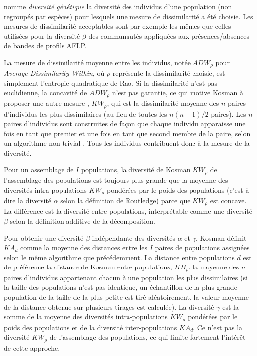 \documentclass[
  11pt,
  french,
  a4paper,
  extrafontsizes,onecolumn,openright
  ]{memoir}
\begin{document}
\textcite{Kosman2013} nomme \emph{diversité génétique} la diversité des individus d'une population (non regroupés par espèces) pour lesquels une mesure de dissimilarité a été choisie.
Les mesures de dissimilarité acceptables \autocite{Kosman2005} sont par exemple les mêmes que celles utilisées pour la diversité \(\beta\) des communautés appliquées aux présences/absences de bandes de profils AFLP.

La mesure de dissimilarité moyenne entre les individus, notée \(ADW_{\rho}\) pour \emph{Average Dissimilarity Within}, où \(\rho\) représente la dissimilarité choisie, est simplement l'entropie quadratique de Rao.
Si la dissimilarité n'est pas euclidienne, la concavité de \(ADW_{\rho}\) n'est pas garantie, ce qui motive Kosman à proposer une autre mesure \autocite{Kosman1996,Kosman2007}, \({KW}_{\rho}\), qui est la dissimilarité moyenne des \(n\) paires d'individus les plus dissimilaires (au lieu de toutes les \({n(n-1)}/{2}\) paires).
Les \(n\) paires d'individus sont construites de façon que chaque individu apparaisse une fois en tant que premier et une fois en tant que second membre de la paire, selon un algorithme non trivial \autocite{Bellman1970}.
Tous les individus contribuent donc à la mesure de la diversité.

Pour un assemblage de \(I\) populations, la diversité de Kosman \({KW}_{\rho}\) de l'assemblage des populations est toujours plus grande que la moyenne des diversités intra-populations \({KW}_{\rho}\) pondérées par le poids des populations (c'est-à-dire la diversité \(\alpha\) selon la définition de Routledge) parce que \({KW}_{\rho}\) est concave.
La différence est la diversité entre populations, interprétable comme une diversité \(\beta\) selon la définition additive de la décomposition.

Pour obtenir une diversité \(\beta\) indépendante des diversités \(\alpha\) et \(\gamma\), Kosman définit \({KA}_{d}\) comme la moyenne des distances entre les \(I\) paires de populations assignées selon le même algorithme que précédemment.
La distance entre populations \(d\) est de préférence la distance de Kosman entre populations, \({KB}_{\rho}\): la moyenne des \(n\) paires d'individus appartenant chacun à une population les plus dissimilaires (si la taille des populations n'est pas identique, un échantillon de la plus grande population de la taille de la plus petite est tiré aléatoirement, la valeur moyenne de la distance obtenue sur plusieurs tirages est calculée).
La diversité \(\gamma\) est la somme de la moyenne des diversités intra-populations \({KW}_{\rho}\) pondérées par le poids des populations et de la diversité inter-populations \({KA}_{d}\).
Ce n'est pas la diversité \({KW}_{\rho}\) de l'assemblage des populations, ce qui limite fortement l'intérêt de cette approche.
\end{document}
